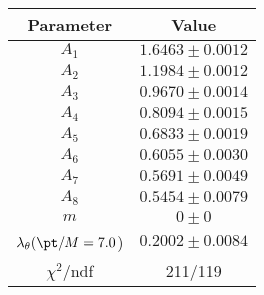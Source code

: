 \begin{tabular}{c|c}
Parameter & Value\\
\hline
$A_1$ & $1.6463\pm0.0012$ \\
$A_2$ & $1.1984\pm0.0012$ \\
$A_3$ & $0.9670\pm0.0014$ \\
$A_4$ & $0.8094\pm0.0015$ \\
$A_5$ & $0.6833\pm0.0019$ \\
$A_6$ & $0.6055\pm0.0030$ \\
$A_7$ & $0.5691\pm0.0049$ \\
$A_8$ & $0.5454\pm0.0079$ \\
$m$ & $0\pm0$ \\
$\lambda_\theta(\pt/M = 7.0$) & $0.2002\pm0.0084$ \\
\hline
$\chi^2$/ndf & 211/119
\end{tabular}
